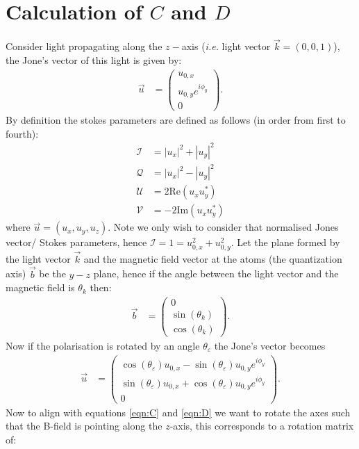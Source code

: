 \documentclass{article}
\begin{document}
\section*{Calculation of \(C\) and \(D\)}
Consider light propagating along the \(z-\)axis (\textit{i.e.} light vector \(\vec{k} = \left(0,0,1\right)\)), the Jone's vector of this light is given by:
\begin{align}
    \vec{u} &= \begin{pmatrix}
    u_{0,x} \\
    u_{0,y} e^{i \phi_y} \\
    0
\end{pmatrix}.
\end{align}
By definition the stokes parameters are defined as follows (in order from first to fourth):
\begin{align}
    \mathcal{I} &= |u_x|^2 + |u_y|^2 \\ 
    \mathcal{Q} &= |u_x|^2 - |u_y|^2 \\
    \mathcal{U} &= 2 \text{Re} \left(u_x u_y^*\right) \\
    \mathcal{V} &= -2 \text{Im}\left(u_x u_y^*\right)
\end{align}
where \(\vec{u} = (u_x,u_y,u_z)\). Note we only wish to consider that normalised Jones vector/ Stokes parameters, hence \(\mathcal{I}=1=u_{0,x}^2+u_{0,y}^2\). Let the plane formed by the light vector \(\vec{k}\) and the magnetic field vector at the atoms (the quantization axis) \(\vec{b}\) be the \(y-z\) plane, hence if the angle between the light vector and the magnetic field is \(\theta_k\) then:
\begin{align}
        \vec{b} &= \begin{pmatrix}
    0 \\
    \sin(\theta_k) \\
    \cos(\theta_k)
\end{pmatrix}.
\end{align}
Now if the polarisation is rotated by an angle \(\theta_\varepsilon\) the Jone's vector becomes 
\begin{align}
    \vec{u} &= \begin{pmatrix}
    \cos(\theta_\varepsilon) u_{0,x} -\sin(\theta_\varepsilon) u_{0,y} e^{i \phi_y}\\
    \sin(\theta_\varepsilon) u_{0,x} +\cos(\theta_\varepsilon) u_{0,y} e^{i \phi_y} \\
    0
\end{pmatrix}.
\end{align}
Now to align with equations \ref{eqn:C} and \ref{eqn:D} we want to rotate the axes such that the B-field is pointing along the \(z\)-axis, this corresponds to a rotation matrix of:
\end{document}
